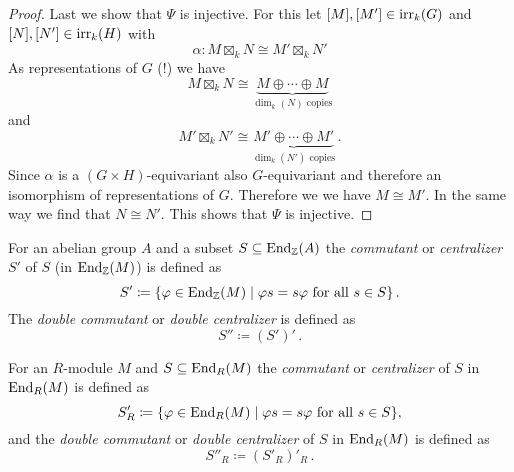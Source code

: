 \begin{proof}
  Last we show that $\Psi$ is injective.
  For this let $[M], [M'] \in \operatorname{irr}_k(G)$ and $[N], [N'] \in \operatorname{irr}_k(H)$ with
  \[
            \alpha
    \colon  M  \boxtimes_k N
    \cong   M' \boxtimes_k N'
  \]
  As representations of $G$ (!) we have
  \[
          M \boxtimes_k N
    \cong \underbrace{ M \oplus \dotsb \oplus M }_{ \dim_k(N) \text{ copies} }
  \]
  and
  \[
          M' \boxtimes_k N'
    \cong \underbrace{ M' \oplus \dotsb \oplus M' }_{ \dim_k(N') \text{ copies} }\,.
  \]
  Since $\alpha$ is a $(G \times H)$-equivariant also $G$-equivariant and therefore an isomorphism of representations of $G$.
  Therefore we we have $M \cong M'$.
  In the same way we find that $N \cong N'$.
  This shows that $\Psi$ is injective.
\end{proof}


\begin{defi}
  For an abelian group $A$ and a subset $S \subseteq \operatorname{End}_{\mathbb{Z}}(A)$ the \emph{commutant} or \emph{centralizer} $S'$ of $S$ (in $\operatorname{End}_{\mathbb{Z}}(M)$) is defined as
  \[
              S'
    \coloneqq \{
                \varphi \in \operatorname{End}_{\mathbb{Z}}(M)
              \mid
                \varphi s = s \varphi
                \text{ for all }
                s \in S
              \} \,.
  \]
  The \emph{double commutant} or \emph{double centralizer} is defined as
  \[
    S'' \coloneqq (S')' \,.
  \]
  
  For an $R$-module $M$ and $S \subseteq \operatorname{End}_R(M)$ the \emph{commutant} or \emph{centralizer} of $S$ in $\operatorname{End}_R(M)$ is defined as
  \[
              S'_R
    \coloneqq \{
                \varphi \in \operatorname{End}_R(M)
              \mid
                \varphi s = s \varphi
                \text{ for all }
                s \in S
              \},
  \]
  and the \emph{double commutant} or \emph{double centralizer} of $S$ in $\operatorname{End}_R(M)$ is defined as
  \[
    S''_R \coloneqq (S'_R)'_R \,.
  \]
\end{defi}



